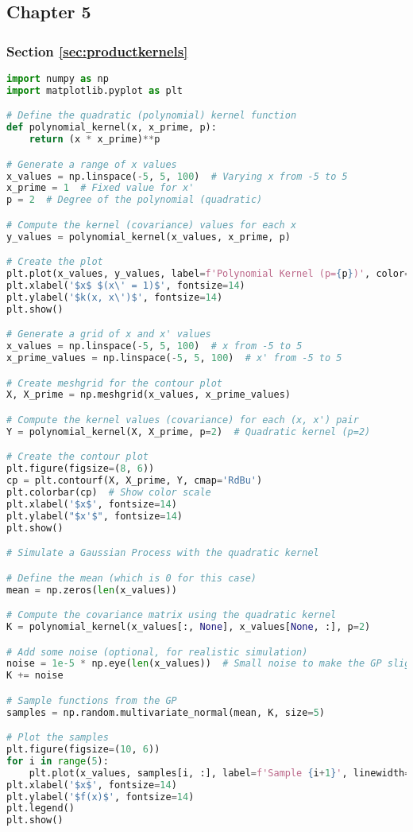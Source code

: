 \documentclass[12pt,a4paper]{article}
\begin{document}
\subsection{Chapter 5}
\label{Chapter 5}

\subsubsection{Section \ref{sec:productkernels}}


\vspace{10pt}
\begin{lstlisting}[language=python, caption={Code of the Creation of Figures \ref{fig:Quad plots}}]
import numpy as np
import matplotlib.pyplot as plt

# Define the quadratic (polynomial) kernel function
def polynomial_kernel(x, x_prime, p):
    return (x * x_prime)**p

# Generate a range of x values
x_values = np.linspace(-5, 5, 100)  # Varying x from -5 to 5
x_prime = 1  # Fixed value for x'
p = 2  # Degree of the polynomial (quadratic)

# Compute the kernel (covariance) values for each x
y_values = polynomial_kernel(x_values, x_prime, p)

# Create the plot
plt.plot(x_values, y_values, label=f'Polynomial Kernel (p={p})', color='steelblue', linewidth=3)
plt.xlabel('$x$ $(x\' = 1)$', fontsize=14)
plt.ylabel('$k(x, x\')$', fontsize=14)
plt.show()

# Generate a grid of x and x' values
x_values = np.linspace(-5, 5, 100)  # x from -5 to 5
x_prime_values = np.linspace(-5, 5, 100)  # x' from -5 to 5

# Create meshgrid for the contour plot
X, X_prime = np.meshgrid(x_values, x_prime_values)

# Compute the kernel values (covariance) for each (x, x') pair
Y = polynomial_kernel(X, X_prime, p=2)  # Quadratic kernel (p=2)

# Create the contour plot
plt.figure(figsize=(8, 6))
cp = plt.contourf(X, X_prime, Y, cmap='RdBu')
plt.colorbar(cp)  # Show color scale
plt.xlabel('$x$', fontsize=14)
plt.ylabel("$x'$", fontsize=14)
plt.show()

# Simulate a Gaussian Process with the quadratic kernel

# Define the mean (which is 0 for this case)
mean = np.zeros(len(x_values))

# Compute the covariance matrix using the quadratic kernel
K = polynomial_kernel(x_values[:, None], x_values[None, :], p=2)

# Add some noise (optional, for realistic simulation)
noise = 1e-5 * np.eye(len(x_values))  # Small noise to make the GP slightly more realistic
K += noise

# Sample functions from the GP
samples = np.random.multivariate_normal(mean, K, size=5)

# Plot the samples
plt.figure(figsize=(10, 6))
for i in range(5):
    plt.plot(x_values, samples[i, :], label=f'Sample {i+1}', linewidth=3)
plt.xlabel('$x$', fontsize=14)
plt.ylabel('$f(x)$', fontsize=14)
plt.legend()
plt.show()
\end{lstlisting}
\end{document}
